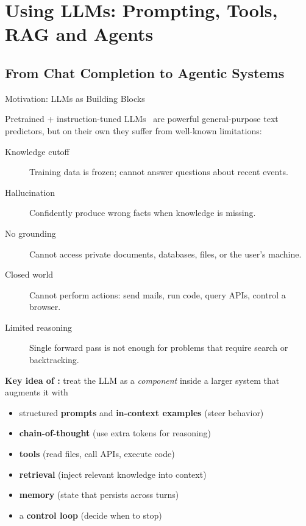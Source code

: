 
\section{Using LLMs: Prompting, Tools, RAG and Agents}

\subsection{From Chat Completion to Agentic Systems}

\begin{frame}{Motivation: LLMs as Building Blocks}

  Pretrained + instruction-tuned LLMs~\cite{ouyang2022instructgpt} are powerful general-purpose
  text predictors, but on their own they suffer from well-known limitations:

  \vspace{0.3em}
  \begin{description}
    \item[Knowledge cutoff] Training data is frozen; cannot answer questions about recent events.
    \item[Hallucination] Confidently produce wrong facts when knowledge is missing.
    \item[No grounding] Cannot access private documents, databases, files, or the user's machine.
    \item[Closed world] Cannot perform actions: send mails, run code, query APIs, control a browser.
    \item[Limited reasoning] Single forward pass is not enough for problems that require search or backtracking.
  \end{description}

  \vspace{0.5em}
  \textbf{Key idea of :} treat the LLM as a \emph{component} inside a larger
  system that augments it with
  \begin{itemize}[nosep]
    \item structured \textbf{prompts} and \textbf{in-context examples} (steer behavior)
    \item \textbf{chain-of-thought} (use extra tokens for reasoning)
    \item \textbf{tools} (read files, call APIs, execute code)
    \item \textbf{retrieval} (inject relevant knowledge into context)
    \item \textbf{memory} (state that persists across turns)
    \item a \textbf{control loop} (decide when to stop)
  \end{itemize}
\end{frame}

